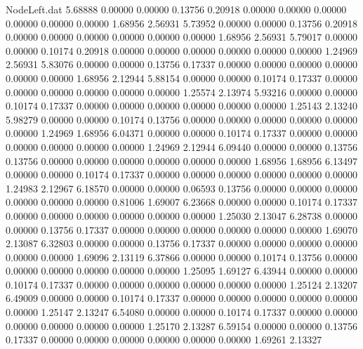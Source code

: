 \begin{filecontents}{NodeLeft.dat}
   5.68888    0.00000    0.00000     0.13756    0.20918    0.00000    0.00000    0.00000    0.00000    0.00000    0.00000    1.68956    2.56931
   5.73952    0.00000    0.00000     0.13756    0.20918    0.00000    0.00000    0.00000    0.00000    0.00000    0.00000    1.68956    2.56931
   5.79017    0.00000    0.00000     0.10174    0.20918    0.00000    0.00000    0.00000    0.00000    0.00000    0.00000    1.24969    2.56931
   5.83076    0.00000    0.00000     0.13756    0.17337    0.00000    0.00000    0.00000    0.00000    0.00000    0.00000    1.68956    2.12944
   5.88154    0.00000    0.00000     0.10174    0.17337    0.00000    0.00000    0.00000    0.00000    0.00000    0.00000    1.25574    2.13974
   5.93216    0.00000    0.00000     0.10174    0.17337    0.00000    0.00000    0.00000    0.00000    0.00000    0.00000    1.25143    2.13240
   5.98279    0.00000    0.00000     0.10174    0.13756    0.00000    0.00000    0.00000    0.00000    0.00000    0.00000    1.24969    1.68956
   6.04371    0.00000    0.00000     0.10174    0.17337    0.00000    0.00000    0.00000    0.00000    0.00000    0.00000    1.24969    2.12944
   6.09440    0.00000    0.00000     0.13756    0.13756    0.00000    0.00000    0.00000    0.00000    0.00000    0.00000    1.68956    1.68956
   6.13497    0.00000    0.00000     0.10174    0.17337    0.00000    0.00000    0.00000    0.00000    0.00000    0.00000    1.24983    2.12967
   6.18570    0.00000    0.00000     0.06593    0.13756    0.00000    0.00000    0.00000    0.00000    0.00000    0.00000    0.81006    1.69007
   6.23668    0.00000    0.00000     0.10174    0.17337    0.00000    0.00000    0.00000    0.00000    0.00000    0.00000    1.25030    2.13047
   6.28738    0.00000    0.00000     0.13756    0.17337    0.00000    0.00000    0.00000    0.00000    0.00000    0.00000    1.69070    2.13087
   6.32803    0.00000    0.00000     0.13756    0.17337    0.00000    0.00000    0.00000    0.00000    0.00000    0.00000    1.69096    2.13119
   6.37866    0.00000    0.00000     0.10174    0.13756    0.00000    0.00000    0.00000    0.00000    0.00000    0.00000    1.25095    1.69127
   6.43944    0.00000    0.00000     0.10174    0.17337    0.00000    0.00000    0.00000    0.00000    0.00000    0.00000    1.25124    2.13207
   6.49009    0.00000    0.00000     0.10174    0.17337    0.00000    0.00000    0.00000    0.00000    0.00000    0.00000    1.25147    2.13247
   6.54080    0.00000    0.00000     0.10174    0.17337    0.00000    0.00000    0.00000    0.00000    0.00000    0.00000    1.25170    2.13287
   6.59154    0.00000    0.00000     0.13756    0.17337    0.00000    0.00000    0.00000    0.00000    0.00000    0.00000    1.69261    2.13327

\end{filecontents}
